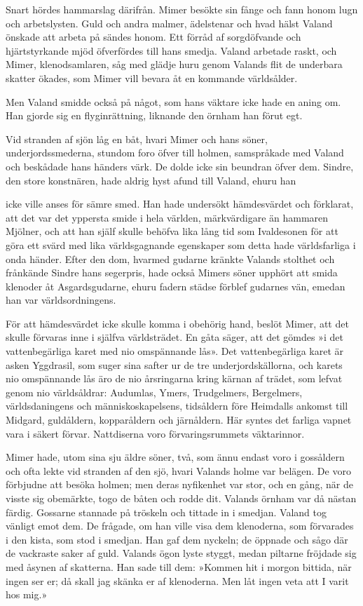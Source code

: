 Snart hördes hammarslag därifrån. Mimer besökte sin fånge och fann honom
lugn och arbetslysten. Guld och andra malmer, ädelstenar och hvad hälst
Valand önskade att arbeta på sändes honom. Ett förråd af sorgdöfvande
och hjärtstyrkande mjöd öfverfördes till hans smedja. Valand arbetade
raskt, och Mimer, klenodsamlaren, såg med glädje huru genom Valands flit
de underbara skatter ökades, som Mimer vill bevara åt en kommande
världsålder.

Men Valand smidde också på något, som hans väktare icke hade en aning
om. Han gjorde sig en flyginrättning, liknande den örnham han förut egt.

Vid stranden af sjön låg en båt, hvari Mimer och hans söner,
underjordssmederna, stundom foro öfver till holmen, samspråkade med
Valand och beskådade hans händers värk. De dolde icke sin beundran öfver
dem. Sindre, den store konstnären, hade aldrig hyst afund till Valand,
ehuru han

icke ville anses för sämre smed. Han hade undersökt hämdesvärdet och
förklarat, att det var det yppersta smide i hela världen, märkvärdigare
än hammaren Mjölner, och att han själf skulle behöfva lika lång tid som
Ivaldesonen för att göra ett svärd med lika världsgagnande egenskaper
som detta hade världsfarliga i onda händer. Efter den dom, hvarmed
gudarne kränkte Valands stolthet och frånkände Sindre hans segerpris,
hade också Mimers söner upphört att smida klenoder åt Asgardsgudarne,
ehuru fadern städse förblef gudarnes vän, emedan han var
världsordningens.

För att hämdesvärdet icke skulle komma i obehörig hand, beslöt Mimer,
att det skulle förvaras inne i själfva världsträdet. En gåta säger, att
det gömdes »i det vattenbegärliga karet med nio omspännande lås». Det
vattenbegärliga karet är asken Yggdrasil, som suger sina safter ur de
tre underjordskällorna, och karets nio omspännande lås äro de nio
årsringarna kring kärnan af trädet, som lefvat genom nio världsåldrar:
Audumlas, Ymers, Trudgelmers, Bergelmers, världsdaningens och
människoskapelsens, tidsåldern före Heimdalls ankomst till Midgard,
guldåldern, kopparåldern och järnåldern. Här syntes det farliga vapnet
vara i säkert förvar. Nattdiserna voro förvaringsrummets väktarinnor.

Mimer hade, utom sina sju äldre söner, två, som ännu endast voro i
gossåldern och ofta lekte vid stranden af den sjö, hvari Valands holme
var belägen. De voro förbjudne att besöka holmen; men deras nyfikenhet
var stor, och en gång, när de visste sig obemärkte, togo de båten och
rodde dit. Valands örnham var då nästan färdig. Gossarne stannade på
tröskeln och tittade in i smedjan. Valand tog vänligt emot dem. De
frågade, om han ville visa dem klenoderna, som förvarades i den kista,
som stod i smedjan. Han gaf dem nyckeln; de öppnade och sågo där de
vackraste saker af guld. Valands ögon lyste styggt, medan piltarne
fröjdade sig med åsynen af skatterna. Han sade till dem: »Kommen hit i
morgon bittida, när ingen ser er; då skall jag skänka er af klenoderna.
Men låt ingen veta att I varit hos mig.»

